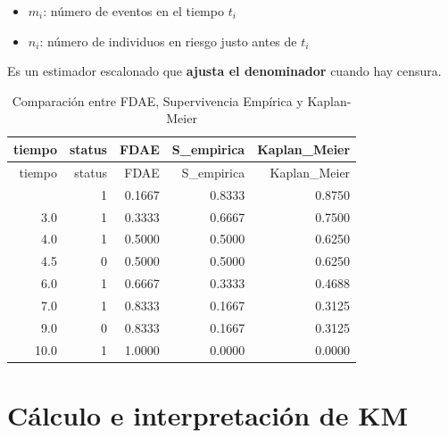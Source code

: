 \documentclass[
]{article}
\providecommand{\tightlist}{%
  \setlength{\itemsep}{0pt}\setlength{\parskip}{0pt}}
\begin{document}
\begin{itemize}
\tightlist
\item
  \(m_i\): número de eventos en el tiempo \(t_i\)
\item
  \(n_i\): número de individuos en riesgo justo antes de \(t_i\)
\end{itemize}

Es un estimador escalonado que \textbf{ajusta el denominador} cuando hay
censura.

\begin{tcolorbox}[enhanced jigsaw, arc=.35mm, coltitle=black, opacitybacktitle=0.6, colbacktitle=quarto-callout-note-color!10!white, breakable, toprule=.15mm, titlerule=0mm, colframe=quarto-callout-note-color-frame, colback=white, bottomrule=.15mm, leftrule=.75mm, rightrule=.15mm, bottomtitle=1mm, toptitle=1mm, opacityback=0, left=2mm, title=\textcolor{quarto-callout-note-color}{\faInfo}\hspace{0.5em}{Ejemplo}]

\begin{longtable}[]{@{}rrrrr@{}}
\caption{Comparación entre FDAE, Supervivencia Empírica y
Kaplan-Meier}\tabularnewline
\toprule\noalign{}
tiempo & status & FDAE & S\_empirica & Kaplan\_Meier \\
\midrule\noalign{}
\endfirsthead
\toprule\noalign{}
tiempo & status & FDAE & S\_empirica & Kaplan\_Meier \\
\midrule\noalign{}
\endhead
\bottomrule\noalign{}
\endlastfoot
2.0 & 1 & 0.1667 & 0.8333 & 0.8750 \\
3.0 & 1 & 0.3333 & 0.6667 & 0.7500 \\
4.0 & 1 & 0.5000 & 0.5000 & 0.6250 \\
4.5 & 0 & 0.5000 & 0.5000 & 0.6250 \\
6.0 & 1 & 0.6667 & 0.3333 & 0.4688 \\
7.0 & 1 & 0.8333 & 0.1667 & 0.3125 \\
9.0 & 0 & 0.8333 & 0.1667 & 0.3125 \\
10.0 & 1 & 1.0000 & 0.0000 & 0.0000 \\
\end{longtable}

\end{tcolorbox}

\section{Cálculo e interpretación de
KM}\label{cuxe1lculo-e-interpretaciuxf3n-de-km}
\end{document}
